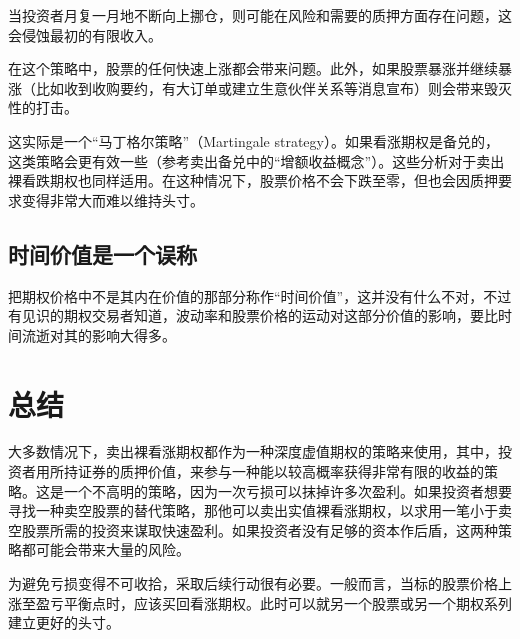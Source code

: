 当投资者月复一月地不断向上挪仓，则可能在风险和需要的质押方面存在问题，这会侵蚀最初的有限收入。

在这个策略中，股票的任何快速上涨都会带来问题。此外，如果股票暴涨并继续暴涨（比如收到收购要约，有大订单或建立生意伙伴关系等消息宣布）则会带来毁灭性的打击。

这实际是一个“马丁格尔策略”（Martingale strategy）。如果看涨期权是备兑的，这类策略会更有效一些（参考卖出备兑中的“增额收益概念”）。这些分析对于卖出裸看跌期权也同样适用。在这种情况下，股票价格不会下跌至零，但也会因质押要求变得非常大而难以维持头寸。
\subsection{时间价值是一个误称}
把期权价格中不是其内在价值的那部分称作“时间价值”，这并没有什么不对，不过有见识的期权交易者知道，波动率和股票价格的运动对这部分价值的影响，要比时间流逝对其的影响大得多。
\section{总结}
大多数情况下，卖出裸看涨期权都作为一种深度虚值期权的策略来使用，其中，投资者用所持证券的质押价值，来参与一种能以较高概率获得非常有限的收益的策略。这是一个不高明的策略，因为一次亏损可以抹掉许多次盈利。如果投资者想要寻找一种卖空股票的替代策略，那他可以卖出实值裸看涨期权，以求用一笔小于卖空股票所需的投资来谋取快速盈利。如果投资者没有足够的资本作后盾，这两种策略都可能会带来大量的风险。

为避免亏损变得不可收拾，采取后续行动很有必要。一般而言，当标的股票价格上涨至盈亏平衡点时，应该买回看涨期权。此时可以就另一个股票或另一个期权系列建立更好的头寸。